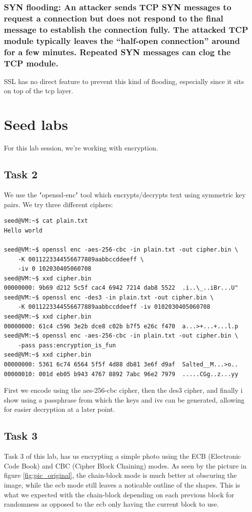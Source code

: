 \documentclass{article}
\begin{document}
\subsubsection{SYN flooding: An attacker sends TCP SYN messages to request a 
connection 
but does not respond to the final message to establish the connection fully. The 
attacked TCP module typically leaves the “half-open connection” around for a few 
minutes. Repeated SYN messages can clog the TCP module.}
SSL has no direct feature to prevent this kind of flooding, especially since it sits
on top of the tcp layer.


\section{Seed labs}
For this lab session, we're working with encryption.\\
\subsection{Task 2}
We use the "openssl-enc" tool which encrypts/decrypts text using symmetric
key pairs. We try three different ciphers:
\begin{verbatim}
seed@VM:~$ cat plain.txt
Hello world

seed@VM:~$ openssl enc -aes-256-cbc -in plain.txt -out cipher.bin \ 
    -K 0011223344556677889aabbccddeeff \ 
    -iv 0 102030405060708
seed@VM:~$ xxd cipher.bin
00000000: 9b69 d212 5c5f cac4 6942 7214 dab8 5522  .i..\_..iBr...U"
seed@VM:~$ openssl enc -des3 -in plain.txt -out cipher.bin \ 
    -K 0011223344556677889aabbccddeeff -iv 0102030405060708
seed@VM:~$ xxd cipher.bin
00000000: 61c4 c596 3e2b dce8 c02b b7f5 e26c f470  a...>+...+...l.p
seed@VM:~$ openssl enc -aes-256-cbc -in plain.txt -out cipher.bin \ 
    -pass pass:encryption_is_fun
seed@VM:~$ xxd cipher.bin
00000000: 5361 6c74 6564 5f5f 4d88 db81 3e6f d9af  Salted__M...>o..
00000010: 001d eb05 b943 4767 8892 7abc 96e2 7979  .....CGg..z...yy
\end{verbatim}
First we encode using the aes-256-cbc cipher, then the des3 cipher, and finally
i show using a passphrase from which the keys and ivs can be generated, allowing for
easier decryption at a later point.

\subsection{Task 3}
Task 3 of this lab, has us encrypting a simple photo using the ECB (Electronic Code
Book) and CBC (Cipher Block Chaining) modes. As seen by the picture in 
figure \ref{fig:pic_original}, the chain-block mode is much better at obscuring the
image, while the ecb mode still leaves a noticable outline of the shapes. This is
what we expected with the chain-block depending on each previous block for randomness
as opposed to the ecb only having the current block to use.\\
\end{document}
